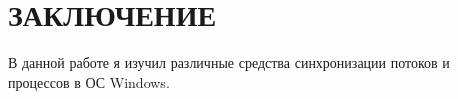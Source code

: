 \section*{ЗАКЛЮЧЕНИЕ}

В данной работе я изучил различные средства синхронизации потоков 
и процессов в ОС Windows.

\newpage